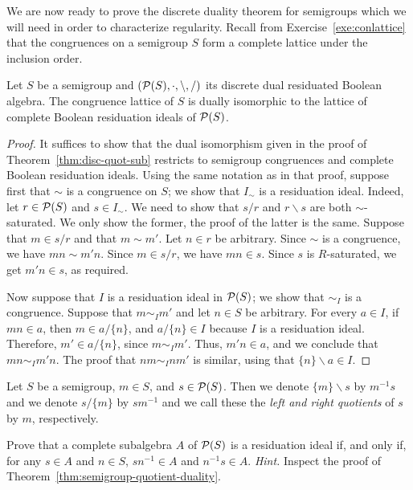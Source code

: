 We are now ready to prove the discrete duality theorem for semigroups which we will need in order to characterize regularity. Recall from Exercise~\ref{exe:conlattice} that the congruences on a semigroup $S$ form a complete lattice under the inclusion order.

\begin{theorem}\label{thm:semigroup-quotient-duality}
  Let $S$ be a semigroup and $(\mathcal{P}(S), \cdot, \backslash, \slash)$ its discrete dual residuated Boolean algebra. The congruence lattice of $S$ is dually isomorphic to the lattice of complete Boolean residuation ideals of $\mathcal{P}(S)$.%
\end{theorem}
\begin{proof}
  It suffices to show that the dual isomorphism given in the proof of Theorem~\ref{thm:disc-quot-sub} restricts to semigroup congruences and complete Boolean residuation ideals. Using the same notation as in that proof, suppose first that $\sim$ is a congruence on $S$; we show that $I_\sim$ is a residuation ideal. Indeed, let $r \in \mathcal{P}(S)$ and $s \in I_\sim$. We need to show that $s/r$ and $r \backslash s$ are both $\sim$-saturated. We only show the former, the proof of the latter is the same. Suppose that $m \in s/r$ and that $m \sim m'$. Let $n \in r$ be arbitrary. Since $\sim$ is a congruence, we have $mn \sim m'n$. Since $m \in s/r$, we have $mn \in s$. Since $s$ is $R$-saturated, we get $m'n \in s$, as required.

  Now suppose that $I$ is a residuation ideal in $\mathcal{P}(S)$; we show that $\sim_I$ is a congruence. Suppose that $m \sim_I m'$ and let $n \in S$ be arbitrary. For every $a \in I$, if $mn \in a$, then $m \in a/\{n\}$, and $a/\{n\} \in I$ because $I$ is a residuation ideal. Therefore, $m' \in a/\{n\}$, since $m \sim_I m'$. Thus, $m'n \in a$, and we conclude that $mn \sim_I m'n$. The proof that $nm \sim_I nm'$ is similar, using that $\{n\}\backslash a \in I$.
\end{proof}

\begin{definition}
Let $S$ be a semigroup, $m\in S$, and  $s\in\mathcal{P}(S)$. Then we denote $\{m\}\backslash s$ by $m^{-1}s$ and we denote $s/\{m\}$ by $sm^{-1}$ and we call these the \emph{left and right quotients} of $s$ by $m$, respectively.
\end{definition}


\begin{exercise}\easy \label{exe:quotients-enough}
Prove that a complete subalgebra $A$ of $\mathcal{P}(S)$ is a residuation ideal if, and only if, for any $s \in A$ and $n \in S$, $sn^{-1} \in A$ and $n^{-1} s \in A$. {\it Hint.} Inspect the proof of Theorem~\ref{thm:semigroup-quotient-duality}.
\end{exercise}

